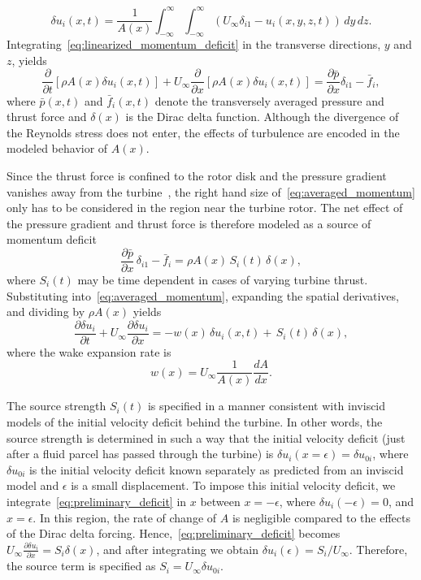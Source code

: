 \begin{equation}
\label{eq:area_velocity}
\delta u_i(x,t) = \frac{1}{A(x)}\int_{-\infty}^{\infty} \int_{-\infty}^{\infty}( U_\infty\delta_{i1} - u_i(x,y,z,t)) \, dy \, dz.
\end{equation}
Integrating~\eqref{eq:linearized_momentum_deficit} in the transverse directions, $y$ and $z$, yields
\begin{equation}
\label{eq:averaged_momentum}
\frac{\partial}{\partial t} \left[ \rho A(x) \delta u_i(x,t) \right] + U_\infty \frac{\partial }{\partial x} \left[ \rho  A(x) \delta u_i(x,t)\right] = \frac{\partial \bar{p}}{\partial x}\delta _{i1} - \bar{f}_i ,
\end{equation}
where $\bar{p}(x,t)$ and $\bar{f}_i(x,t)$ denote the transversely averaged pressure and thrust force and $\delta(x)$ is the Dirac delta function. Although the divergence of the Reynolds stress does not enter, the effects of turbulence are encoded in the modeled behavior of $A(x)$. 

Since the thrust force is confined to the rotor disk and the pressure gradient vanishes away from the turbine~\cite{Glauert1935a}, the right hand size of~\eqref{eq:averaged_momentum} only has to be considered in the region near the turbine rotor. The net effect of the pressure gradient and thrust force is therefore modeled as a source of momentum deficit
\begin{equation}
\frac{\partial \bar{p}}{\partial x}\,\delta _{i1} - \bar{f}_i = \rho A(x) \,S_i(t) \, \delta(x),
\end{equation}
where $S_i(t)$ may be time dependent in cases of varying turbine thrust. Substituting  into~\eqref{eq:averaged_momentum}, expanding the spatial derivatives, and dividing by $\rho A(x)$ yields
\begin{equation}
\label{eq:preliminary_deficit}
\frac{\partial \delta u_i}{\partial t} + U_\infty \frac{\partial \delta u_i }{\partial x} = - w(x) \,\delta u_i(x,t) + \,S_i(t) \, \delta(x),
\end{equation}
where the wake expansion rate is
\begin{equation}
w(x) = U_\infty  \frac{1}{A(x)} \frac{d A}{d x}.
\end{equation}

The source strength $S_i(t)$ is specified in a manner consistent with inviscid models of the initial velocity deficit behind the turbine.  In other words, the source strength is determined in such a way that the initial velocity deficit (just after a fluid parcel has passed through the turbine) is $\delta u_i(x=\epsilon) = \delta u_{0i} $, where $\delta u_{0i}$ is the initial velocity deficit known separately as predicted from an inviscid model and $\epsilon$ is a small displacement. To impose this initial velocity deficit, we integrate~\eqref{eq:preliminary_deficit} in $x$ between $x=-\epsilon$, where $\delta u_i(- \epsilon)=0$, and $x=\epsilon$. In this region, the rate of change of $A$ is negligible compared to the effects of the Dirac delta forcing. Hence,~\eqref{eq:preliminary_deficit} becomes $U_\infty  \frac{\partial \delta u_i}{\partial x} = S_i  \delta(x)$, and after integrating we obtain  $\delta u_i(\epsilon)=S_i / U_{\infty}$. Therefore, the source term is specified as $S_i = U_\infty \delta u_{0i}$.

